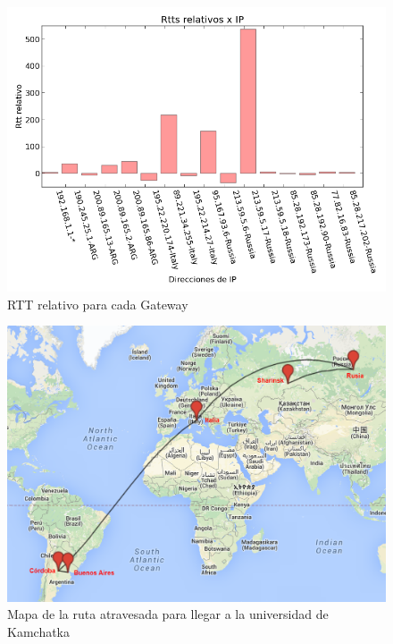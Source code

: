 \begin{figure}[H]
	\begin{center}
		  \includegraphics[scale=0.5]{../graficos_informe/kamgu_rtt.png}
		  \caption{RTT relativo para cada Gateway}
		  \label{fig:contra1}
	\end{center}
\end{figure}


\begin{figure}[H]
	\begin{center}
		  \includegraphics[scale=0.4]{../mapas/mapa_kamgu.png}
		  \caption{Mapa de la ruta atravesada para llegar a la universidad de Kamchatka}
		  \label{fig:contra1}
	\end{center}
\end{figure}

